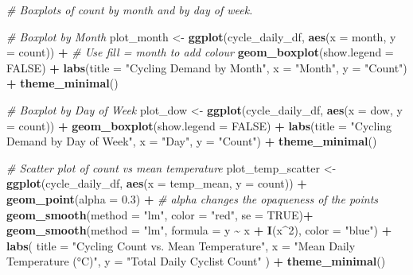 \documentclass[
]{article}
\newenvironment{Shaded}{\begin{snugshade}}{\end{snugshade}}
\newcommand{\AttributeTok}[1]{\textcolor[rgb]{0.13,0.29,0.53}{#1}}
\newcommand{\CommentTok}[1]{\textcolor[rgb]{0.56,0.35,0.01}{\textit{#1}}}
\newcommand{\ConstantTok}[1]{\textcolor[rgb]{0.56,0.35,0.01}{#1}}
\newcommand{\DecValTok}[1]{\textcolor[rgb]{0.00,0.00,0.81}{#1}}
\newcommand{\FloatTok}[1]{\textcolor[rgb]{0.00,0.00,0.81}{#1}}
\newcommand{\FunctionTok}[1]{\textcolor[rgb]{0.13,0.29,0.53}{\textbf{#1}}}
\newcommand{\NormalTok}[1]{#1}
\newcommand{\OtherTok}[1]{\textcolor[rgb]{0.56,0.35,0.01}{#1}}
\newcommand{\SpecialCharTok}[1]{\textcolor[rgb]{0.81,0.36,0.00}{\textbf{#1}}}
\newcommand{\StringTok}[1]{\textcolor[rgb]{0.31,0.60,0.02}{#1}}
\begin{document}
\begin{Shaded}
\begin{Highlighting}[]
\CommentTok{\# Boxplots of count by month and by day of week.}

\CommentTok{\# Boxplot by Month }
\NormalTok{plot\_month }\OtherTok{\textless{}{-}} \FunctionTok{ggplot}\NormalTok{(cycle\_daily\_df, }\FunctionTok{aes}\NormalTok{(}\AttributeTok{x =}\NormalTok{ month, }\AttributeTok{y =}\NormalTok{ count)) }\SpecialCharTok{+} \CommentTok{\# Use fill = month to add colour}
  \FunctionTok{geom\_boxplot}\NormalTok{(}\AttributeTok{show.legend =} \ConstantTok{FALSE}\NormalTok{) }\SpecialCharTok{+}
  \FunctionTok{labs}\NormalTok{(}\AttributeTok{title =} \StringTok{"Cycling Demand by Month"}\NormalTok{, }\AttributeTok{x =} \StringTok{"Month"}\NormalTok{, }\AttributeTok{y =} \StringTok{"Count"}\NormalTok{) }\SpecialCharTok{+}
  \FunctionTok{theme\_minimal}\NormalTok{()}

\CommentTok{\# Boxplot by Day of Week}
\NormalTok{plot\_dow }\OtherTok{\textless{}{-}} \FunctionTok{ggplot}\NormalTok{(cycle\_daily\_df, }\FunctionTok{aes}\NormalTok{(}\AttributeTok{x =}\NormalTok{ dow, }\AttributeTok{y =}\NormalTok{ count)) }\SpecialCharTok{+}
  \FunctionTok{geom\_boxplot}\NormalTok{(}\AttributeTok{show.legend =} \ConstantTok{FALSE}\NormalTok{) }\SpecialCharTok{+}
  \FunctionTok{labs}\NormalTok{(}\AttributeTok{title =} \StringTok{"Cycling Demand by Day of Week"}\NormalTok{, }\AttributeTok{x =} \StringTok{"Day"}\NormalTok{, }\AttributeTok{y =} \StringTok{"Count"}\NormalTok{) }\SpecialCharTok{+}
  \FunctionTok{theme\_minimal}\NormalTok{()}

\CommentTok{\# Scatter plot of count vs mean temperature}
\NormalTok{plot\_temp\_scatter }\OtherTok{\textless{}{-}} \FunctionTok{ggplot}\NormalTok{(cycle\_daily\_df, }\FunctionTok{aes}\NormalTok{(}\AttributeTok{x =}\NormalTok{ temp\_mean, }\AttributeTok{y =}\NormalTok{ count)) }\SpecialCharTok{+}
  \FunctionTok{geom\_point}\NormalTok{(}\AttributeTok{alpha =} \FloatTok{0.3}\NormalTok{) }\SpecialCharTok{+} \CommentTok{\# alpha changes the opaqueness of the points}
  \FunctionTok{geom\_smooth}\NormalTok{(}\AttributeTok{method =} \StringTok{"lm"}\NormalTok{, }\AttributeTok{color =} \StringTok{"red"}\NormalTok{, }\AttributeTok{se =} \ConstantTok{TRUE}\NormalTok{)}\SpecialCharTok{+}
  \FunctionTok{geom\_smooth}\NormalTok{(}\AttributeTok{method =} \StringTok{"lm"}\NormalTok{, }\AttributeTok{formula =}\NormalTok{ y }\SpecialCharTok{\textasciitilde{}}\NormalTok{ x }\SpecialCharTok{+} \FunctionTok{I}\NormalTok{(x}\SpecialCharTok{\^{}}\DecValTok{2}\NormalTok{), }\AttributeTok{color =} \StringTok{"blue"}\NormalTok{) }\SpecialCharTok{+}
  \FunctionTok{labs}\NormalTok{(}
    \AttributeTok{title =} \StringTok{"Cycling Count vs. Mean Temperature"}\NormalTok{,}
    \AttributeTok{x =} \StringTok{"Mean Daily Temperature (°C)"}\NormalTok{,}
    \AttributeTok{y =} \StringTok{"Total Daily Cyclist Count"}
\NormalTok{  ) }\SpecialCharTok{+}
  \FunctionTok{theme\_minimal}\NormalTok{()}


\end{Highlighting}
\end{Shaded}
\end{document}
